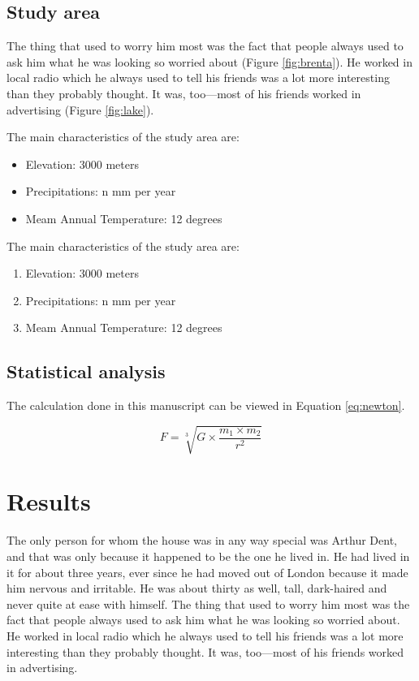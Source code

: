 \documentclass[a4paper, 12pt]{article}
\begin{document}
\subsection{Study area} %
The thing that used to worry him most was the fact that people always used to ask him what he was looking so worried about (Figure \ref{fig:brenta}). He worked in local radio which he always used to tell his friends was a lot more interesting than they probably thought. It was, too—most of his friends worked in advertising (Figure \ref{fig:lake}).

\noindent The main characteristics of the study area are:
\begin{itemize}
    \item Elevation: 3000 meters
    \item Precipitations: n mm per year
    \item Meam Annual Temperature: 12 degrees
\end{itemize}

\noindent The main characteristics of the study area are:
\begin{enumerate}
    \item Elevation: 3000 meters
    \item Precipitations: n mm per year
    \item Meam Annual Temperature: 12 degrees
\end{enumerate}

\subsection{Statistical analysis}
The calculation done in this manuscript can be viewed in Equation \ref{eq:newton}.

\begin{equation}
    F = \sqrt[3]{G \times \frac{m_1 \times m_2}{r^2}}
    \label{eq:newton}
\end{equation}


\section{Results}

The only person for whom the house was in any way special was Arthur Dent, and that was only because it happened to be the one he lived in. He had lived in it for about three years, ever since he had moved out of London because it made him nervous and irritable. He was about thirty as well, tall, dark-haired and never quite at ease with himself. The thing that used to worry him most was the fact that people always used to ask him what he was looking so worried about. He worked in local radio which he always used to tell his friends was a lot more interesting than they probably thought. It was, too—most of his friends worked in advertising.
\end{document}
